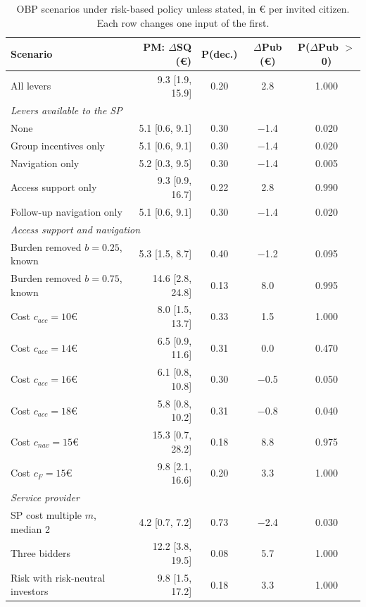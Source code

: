 \documentclass[12pt]{article}
\begin{document}
\begin{table}[!ht]
\centering
\footnotesize
\renewcommand{\arraystretch}{0.92}
\setlength{\tabcolsep}{6pt}
\caption{OBP scenarios under risk-based policy unless stated, in € per invited citizen. Each row changes one input of the first.}
\label{tab:obp_sensitivity}
\begin{tabular}{l r c c c}
\toprule
\textbf{Scenario} & \textbf{PM: $\Delta$SQ (€)} & \textbf{P(dec.)} & \textbf{$\Delta$Pub (€)} & \textbf{P($\Delta$Pub $>$ 0)} \\
\midrule
All levers & 9.3 [1.9, 15.9] & 0.20 & 2.8 & 1.000 \\
\midrule
\multicolumn{5}{l}{\emph{Levers available to the SP}} \\
None & 5.1 [0.6, 9.1] & 0.30 & $-$1.4 & 0.020 \\
Group incentives only & 5.1 [0.6, 9.1] & 0.30 & $-$1.4 & 0.020 \\
Navigation only & 5.2 [0.3, 9.5] & 0.30 & $-$1.4 & 0.005 \\
Access support only & 9.3 [0.9, 16.7] & 0.22 & 2.8 & 0.990 \\
Follow-up navigation only & 5.1 [0.6, 9.1] & 0.30 & $-$1.4 & 0.020 \\
\midrule
\multicolumn{5}{l}{\emph{Access support and navigation}} \\
Burden removed $b = 0.25$, known & 5.3 [1.5, 8.7] & 0.40 & $-$1.2 & 0.095 \\
Burden removed $b = 0.75$, known & 14.6 [2.8, 24.8] & 0.13 & 8.0 & 0.995 \\
Cost $c_{acc} = 10$€ & 8.0 [1.5, 13.7] & 0.33 & 1.5 & 1.000 \\
Cost $c_{acc} = 14$€ & 6.5 [0.9, 11.6] & 0.31 & 0.0 & 0.470 \\
Cost $c_{acc} = 16$€ & 6.1 [0.8, 10.8] & 0.30 & $-$0.5 & 0.050 \\
Cost $c_{acc} = 18$€ & 5.8 [0.8, 10.2] & 0.31 & $-$0.8 & 0.040 \\
Cost $c_{nav} = 15$€ & 15.3 [0.7, 28.2] & 0.18 & 8.8 & 0.975 \\
Cost $c_F = 15$€ & 9.8 [2.1, 16.6] & 0.20 & 3.3 & 1.000 \\
\midrule
\multicolumn{5}{l}{\emph{Service provider}} \\
SP cost multiple $m$, median 2 & 4.2 [0.7, 7.2] & 0.73 & $-$2.4 & 0.030 \\
Three bidders & 12.2 [3.8, 19.5] & 0.08 & 5.7 & 1.000 \\
Risk with risk-neutral investors & 9.8 [1.5, 17.2] & 0.18 & 3.3 & 1.000 \\

\end{tabular}
\end{table}
\end{document}
